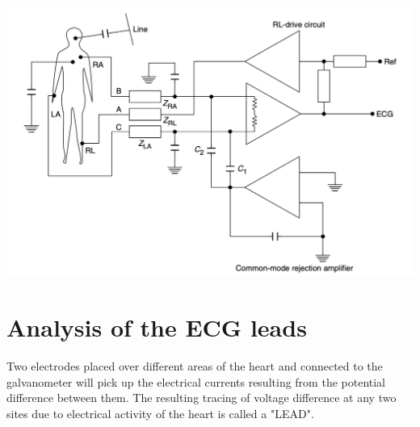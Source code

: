 \documentclass{article}
\begin{document}
\begin{center}
    \includegraphics[scale=0.4]{Screenshot 2023-05-02 at 7.36.40 PM.png}
\end{center}
\section{Analysis of the ECG leads}
Two electrodes placed over different areas of the heart and connected to the galvanometer will pick up the electrical currents resulting from the potential difference between them. The resulting tracing of voltage difference at any two sites due to electrical activity of the heart is called a "LEAD".\\
\end{document}
